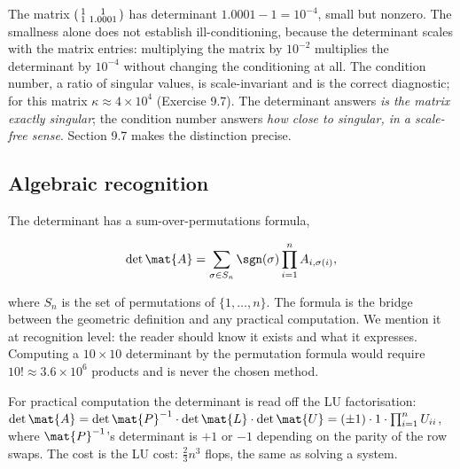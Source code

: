 \begin{example}
The matrix $\begin{psmallmatrix} 1 & 1 \\ 1 & 1.0001
\end{psmallmatrix}$ has determinant $1.0001 - 1 = 10^{-4}$, small but
nonzero. The smallness alone does not establish ill-conditioning,
because the determinant scales with the matrix entries: multiplying
the matrix by $10^{-2}$ multiplies the determinant by $10^{-4}$
without changing the conditioning at all. The condition number, a
ratio of singular values, is scale-invariant and is the correct
diagnostic; for this matrix $\kappa \approx 4 \times 10^{4}$
(Exercise 9.7). The determinant answers \emph{is the matrix exactly
singular}; the condition number answers \emph{how close to singular,
in a scale-free sense}. Section 9.7 makes the distinction precise.
\end{example}

\subsection{Algebraic recognition}

The determinant has a sum-over-permutations formula,

\[
\det \mat{A} = \sum_{\sigma \in S_{n}} \sgn(\sigma) \prod_{i=1}^{n}
A_{i, \sigma(i)},
\]

where $S_{n}$ is the set of permutations of $\{1, \ldots, n\}$. The
formula is the bridge between the geometric definition and any
practical computation. We mention it at recognition level: the
reader should know it exists and what it expresses. Computing a
$10 \times 10$ determinant by the permutation formula would require
$10!\approx 3.6 \times 10^{6}$ products and is never the chosen
method.

For practical computation the determinant is read off the LU
factorisation: $\det \mat{A} = \det \mat{P}^{-1} \cdot \det \mat{L}
\cdot \det \mat{U} = (\pm 1) \cdot 1 \cdot \prod_{i=1}^{n} U_{ii}$,
where $\mat{P}^{-1}$'s determinant is $+1$ or $-1$ depending on the
parity of the row swaps. The cost is the LU cost: $\tfrac{2}{3}n^{3}$
flops, the same as solving a system.

